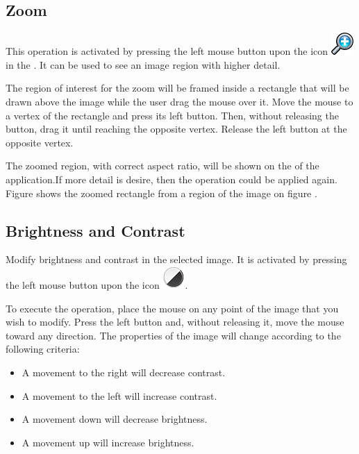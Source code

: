 \documentclass{plantilla-manual-usuario-en}
\begin{document}
\subsection{Zoom}

This operation is activated by pressing the left mouse button upon the icon \includegraphics[scale=0.5]{images/magnifier.png} in the . It can be used to see an image region with higher detail.

The region of interest for the zoom will be framed inside a rectangle that will be drawn above the image while the user drag the mouse over it. Move the mouse to a vertex of the rectangle and press its left button. Then, without releasing the button, drag it until reaching the opposite vertex. Release the left button at the opposite vertex.

The zoomed region, with correct aspect ratio, will be shown on the  of the application.If more detail is desire, then the operation could be applied again. Figure  shows the 
zoomed rectangle from a region of the image on figure .


\subsection{Brightness and Contrast}

Modify brightness and contrast in the selected image. It is activated by pressing the left mouse button upon the icon \includegraphics[scale=0.5]{images/contrast.png}.

To execute the operation, place the mouse on any point of the image that you wish to modify. Press the left button and, without releasing it, move the mouse toward any direction. The properties of the image will change according to the following criteria:

\begin{itemize}
\item A movement to the right will decrease contrast. 
\item A movement to the left will increase contrast. 
\item A movement down will decrease brightness.
\item A movement up will increase brightness.
\end{itemize}
\end{document}
